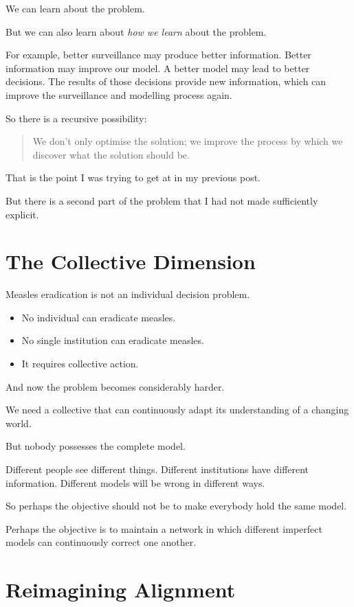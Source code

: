 \documentclass{article}
\begin{document}
We can learn about the problem.

But we can also learn about \textit{how we learn} about the problem.

For example, better surveillance may produce better information. Better information may improve our model. A better model may lead to better decisions. The results of those decisions provide new information, which can improve the surveillance and modelling process again.

So there is a recursive possibility:

\begin{quote}
    We don't only optimise the solution; we improve the process by which we discover what the solution should be.
\end{quote}

That is the point I was trying to get at in my previous post.

But there is a second part of the problem that I had not made sufficiently explicit.

\section*{The Collective Dimension}

Measles eradication is not an individual decision problem.

\begin{itemize}
    \item No individual can eradicate measles.
    \item No single institution can eradicate measles.
    \item It requires collective action.
\end{itemize}

And now the problem becomes considerably harder.

We need a collective that can continuously adapt its understanding of a changing world.

But nobody possesses the complete model.

Different people see different things. Different institutions have different information. Different models will be wrong in different ways.

So perhaps the objective should not be to make everybody hold the same model.

Perhaps the objective is to maintain a network in which different imperfect models can continuously correct one another.

\section*{Reimagining Alignment}
\end{document}
